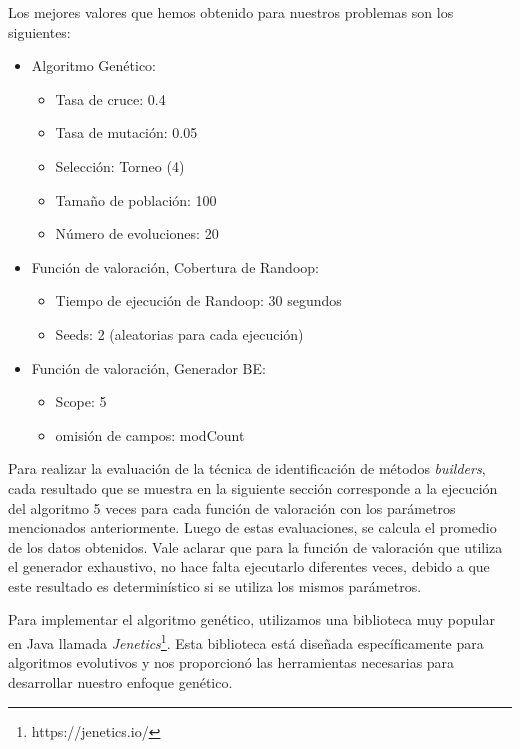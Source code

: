 Los mejores valores que hemos obtenido para nuestros problemas son los siguientes:
\begin{itemize}
    \item Algoritmo Genético:
    \begin{itemize}
        \item Tasa de cruce: 0.4
        \item Tasa de mutación: 0.05
        \item Selección: Torneo (4)
        \item Tamaño de población: 100
        \item Número de evoluciones: 20
    \end{itemize}
    \item Función de valoración, Cobertura de Randoop:
    \begin{itemize}
        \item Tiempo de ejecución de Randoop: 30 segundos
        \item Seeds: 2 (aleatorias para cada ejecución)
    \end{itemize}
     \item Función de valoración, Generador BE:
    \begin{itemize}
        \item Scope: 5
        \item omisión de campos: modCount
    \end{itemize}
\end{itemize}

Para realizar la evaluación de la técnica de identificación de métodos \emph{builders}, cada resultado que se muestra en la siguiente sección corresponde a la ejecución del algoritmo 5 veces para cada función de valoración con los parámetros mencionados anteriormente. Luego de estas evaluaciones, se calcula el promedio de los datos obtenidos.
Vale aclarar que para la función de valoración que utiliza el generador exhaustivo, no hace falta ejecutarlo diferentes veces, debido a que este resultado es determinístico si se utiliza los mismos parámetros.


Para implementar el algoritmo genético, utilizamos una biblioteca muy popular en Java llamada \emph{Jenetics}\footnote{https://jenetics.io/}. Esta biblioteca está diseñada específicamente para algoritmos evolutivos y nos proporcionó las herramientas necesarias para desarrollar nuestro enfoque genético.

